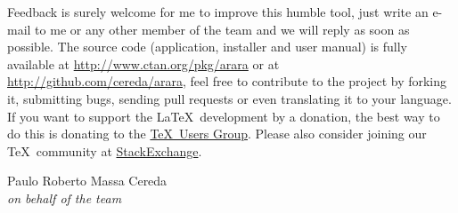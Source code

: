 \documentclass[a4paper,twoside,12pt]{memoir}
\begin{document}
Feedback is surely welcome for me to improve this humble tool, just write an e-mail to me or any other member of the team and we will reply as soon as possible. The source code (application, installer and user manual) is fully available at \url{http://www.ctan.org/pkg/arara} or at \url{http://github.com/cereda/arara}, feel free to contribute to the project by forking it, submitting bugs, sending pull requests or even translating it to your language. If you want to support the \LaTeX\ development by a donation, the best way to do this is donating to the \href{http://www.tug.org/}{\TeX\ Users Group}. Please also  consider joining our \TeX\ community at \href{http://tex.stackexchange.com}{StackExchange}.

\vspace{2em}

\begin{flushright}
Paulo Roberto Massa Cereda\\
\emph{on behalf of the \arara team}
\end{flushright}
\end{document}
